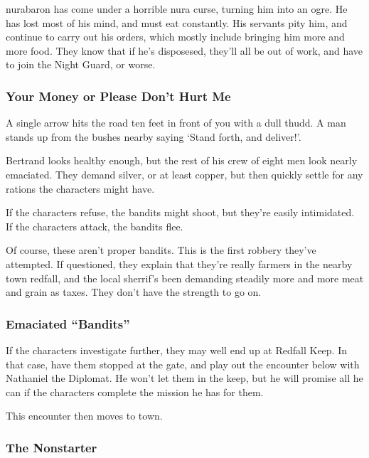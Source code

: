 \gls{nurabaron} has come under a horrible nura curse, turning him into an ogre.  He has lost most of his mind, and must eat constantly.  His servants pity him, and continue to carry out his orders, which mostly include bringing him more and more food.  They know that if he's disposesed, they'll all be out of work, and have to join the Night Guard, or worse.

\subsubsection{Your Money or Please Don't Hurt Me}

\begin{boxtext}
A single arrow hits the road ten feet in front of you with a dull thudd.  A man stands up from the bushes nearby saying `Stand forth, and deliver!'.
\end{boxtext}

Bertrand looks healthy enough, but the rest of his crew of eight men look nearly emaciated.  They demand silver, or at least copper, but then quickly settle for any rations the characters might have.

If the characters refuse, the bandits might shoot, but they're easily intimidated.  If the characters attack, the bandits flee.

Of course, these aren't proper bandits.  This is the first robbery they've attempted.  If questioned, they explain that they're really farmers in the nearby town \gls{redfall}, and the local sherrif's been demanding steadily more and more meat and grain as taxes.  They don't have the strength to go on.

\humansoldier

\subsubsection{Emaciated ``Bandits''}

If the characters investigate further, they may well end up at Redfall Keep.  In that case, have them stopped at the gate, and play out the encounter below with Nathaniel the Diplomat.  He won't let them in the keep, but he will promise all he can if the characters complete the mission he has for them.

This encounter then moves to town.

\subsubsection{The Nonstarter}


